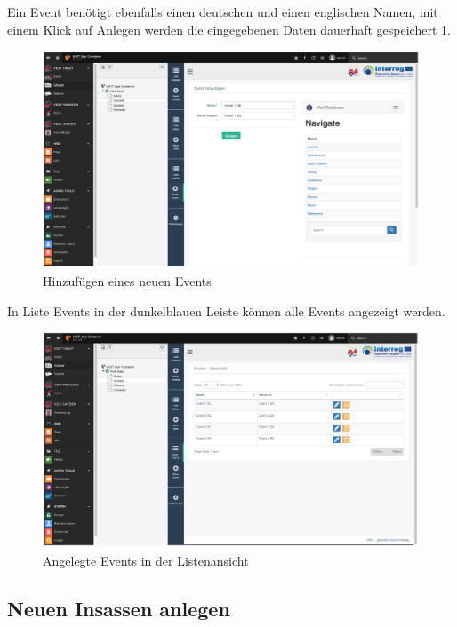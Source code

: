 Ein Event benötigt ebenfalls einen deutschen und einen englischen Namen, mit einem Klick auf Anlegen werden die eingegebenen Daten dauerhaft gespeichert \ref{img:hinzufuegen_event}.
\begin{figure}[ht!]
\centering
\includegraphics[width=12cm]{Figures/paula/glossar/hinzufuegen_event.png}
\caption{Hinzufügen eines neuen Events}
\label{img:hinzufuegen_event}
\end{figure}
In Liste Events in der dunkelblauen Leiste können alle Events angezeigt werden.
\begin{figure}[ht!]
\centering
\includegraphics[width=12cm]{Figures/paula/glossar/angelegte_events_listenansicht.png}
\caption{Angelegte Events in der Listenansicht}
\label{img:angelegte_events_listenansicht}
\end{figure}

\subsection{Neuen Insassen anlegen}

